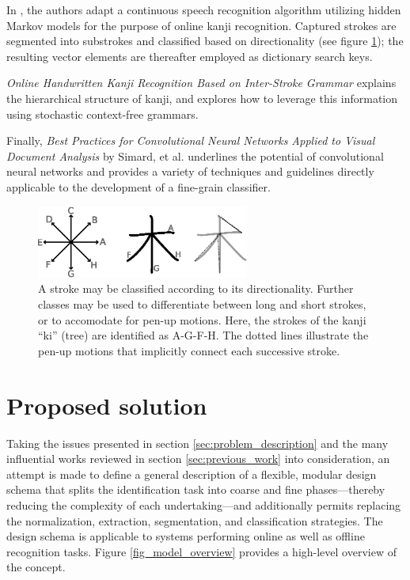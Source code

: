 \documentclass[10pt,conference,a4paper]{IEEEtran}
\begin{document}
	In \cite{nakai2001substroke}, the authors adapt a continuous speech recognition algorithm utilizing
	hidden Markov models for the purpose of online kanji recognition. Captured strokes are segmented into
	substrokes and classified based on directionality (see figure \ref{fig_stroke_categories});
	the resulting vector elements are thereafter employed as dictionary search keys.


	\emph{Online Handwritten Kanji Recognition Based on Inter-Stroke Grammar} explains the hierarchical structure of kanji,
	and explores how to leverage this information using stochastic context-free grammars. \cite{ota2007online}

	Finally, \emph{Best Practices for Convolutional Neural Networks Applied to Visual Document Analysis} by Simard, et al. underlines the
	potential of convolutional neural networks and provides a variety of techniques and guidelines directly applicable to the development of a fine-grain classifier. \cite{simard2003best}


	\begin{figure}
		\centering
		\includegraphics[width=2.75in]{./fig/stroke-categories.eps}
		\caption{A stroke may be classified according to its directionality.
			Further classes may be used to differentiate between long and short strokes,
		or to accomodate for pen-up motions. Here, the strokes of the kanji ``ki'' (tree) are identified as A-G-F-H.
		The dotted lines illustrate the pen-up motions that implicitly connect each successive stroke.}
		\label{fig_stroke_categories}
	\end{figure}



	\section{Proposed solution}
	\label{sec:proposed_solution}

	Taking the issues presented in section \ref{sec:problem_description} and the many influential works reviewed in section \ref{sec:previous_work}
	into consideration, an attempt is made to define a general description of a flexible, modular 
	design schema that splits the identification task into coarse and fine phases---thereby reducing the complexity of each undertaking---and 
	additionally permits replacing the normalization, extraction, segmentation, and classification strategies.
	The design schema is applicable to systems performing online as well as offline recognition tasks.
	Figure \ref{fig_model_overview} provides a high-level overview of the concept.
\end{document}
